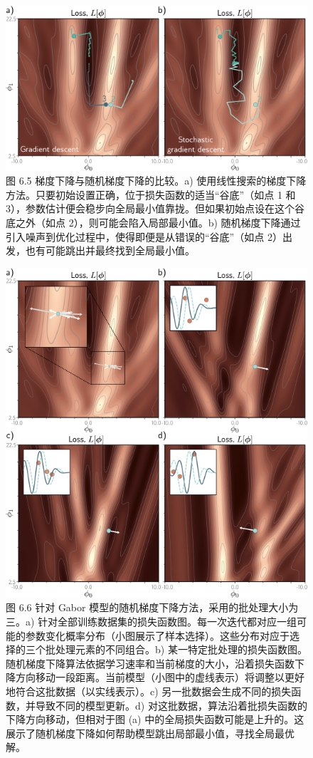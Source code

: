 \begin{figure}[ht!]
\centering
\includegraphics[width=0.7\linewidth]{png/chapter6/TrainGaborGDSGD.png}
\caption{图 6.5 梯度下降与随机梯度下降的比较。a) 使用线性搜索的梯度下降方法。只要初始设置正确，位于损失函数的适当“谷底”（如点 1 和 3），参数估计便会稳步向全局最小值靠拢。但如果初始点设在这个谷底之外（如点 2），则可能会陷入局部最小值。b) 随机梯度下降通过引入噪声到优化过程中，使得即便是从错误的“谷底”（如点 2）出发，也有可能跳出并最终找到全局最小值。}
\end{figure}

\begin{figure}[ht!]
\centering
\includegraphics[width=0.7\linewidth]{png/chapter6/TrainGaborSGDIter.png}
\caption{图 6.6 针对 Gabor 模型的随机梯度下降方法，采用的批处理大小为三。a) 针对全部训练数据集的损失函数图。每一次迭代都对应一组可能的参数变化概率分布（小图展示了样本选择）。这些分布对应于选择的三个批处理元素的不同组合。b) 某一特定批处理的损失函数图。随机梯度下降算法依据学习速率和当前梯度的大小，沿着损失函数下降方向移动一段距离。当前模型（小图中的虚线表示）将调整以更好地符合这批数据（以实线表示）。c) 另一批数据会生成不同的损失函数，并导致不同的模型更新。d) 对这批数据，算法沿着批损失函数的下降方向移动，但相对于图 (a) 中的全局损失函数可能是上升的。这展示了随机梯度下降如何帮助模型跳出局部最小值，寻找全局最优解。}
\end{figure}

